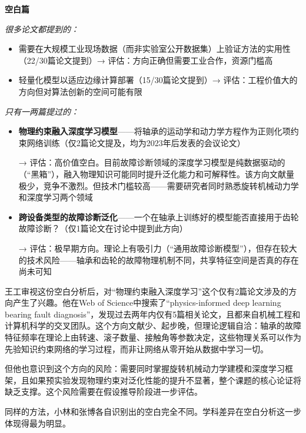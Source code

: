 \begin{aibox}
\smallskip
\textbf{空白篇}

\textit{很多论文都提到的：}
\begin{itemize}[nosep]
\item 需要在大规模工业现场数据（而非实验室公开数据集）上验证方法的实用性（22/30篇论文提到）→ 评估：方向正确但需要工业合作，资源门槛高
\item 轻量化模型以适应边缘计算部署（15/30篇论文提到）→ 评估：工程价值大的方向但对算法创新的空间可能有限
\end{itemize}

\textit{只有一两篇提过的：}
\begin{itemize}[nosep]
\item \textbf{物理约束融入深度学习模型}——将轴承的运动学和动力学方程作为正则化项约束网络训练（仅2篇论文提及，均为2023年后发表的会议论文）

→ 评估：高价值空白。目前故障诊断领域的深度学习模型是纯数据驱动的（``黑箱''），融入物理知识可能同时提升泛化能力和可解释性。该方向文献量极少，竞争不激烈。但技术门槛较高——需要研究者同时熟悉旋转机械动力学和深度学习两个领域

\item \textbf{跨设备类型的故障诊断泛化}——一个在轴承上训练好的模型能否直接用于齿轮故障诊断？（仅1篇论文在讨论中提到此方向）

→ 评估：极早期方向。理论上有吸引力（``通用故障诊断模型''），但存在较大的技术风险——轴承和齿轮的故障物理机制不同，共享特征空间是否真的存在尚未可知
\end{itemize}
\end{aibox}

\begin{critiquebox}
王工审视这份空白分析后，对``物理约束融入深度学习''这个仅有2篇论文涉及的方向产生了兴趣。他在Web of Science中搜索了``physics-informed deep learning bearing fault diagnosis''，发现过去两年内仅有5篇相关论文，且都来自机械工程和计算机科学的交叉团队。这个方向文献少、起步晚，但理论逻辑自洽：轴承的故障特征频率在理论上由转速、滚子数量、接触角等参数决定，这些物理关系可以作为先验知识约束网络的学习过程，而非让网络从零开始从数据中学习一切。

但他也意识到这个方向的风险：需要同时掌握旋转机械动力学建模和深度学习框架，且如果预实验发现物理约束对泛化性能的提升不显著，整个课题的核心论证将缺乏支撑。这个风险需要在假设推导阶段进一步评估。
\end{critiquebox}

\smallskip
同样的方法，小林和张博各自识别出的空白完全不同。学科差异在空白分析这一步体现得最为明显。

